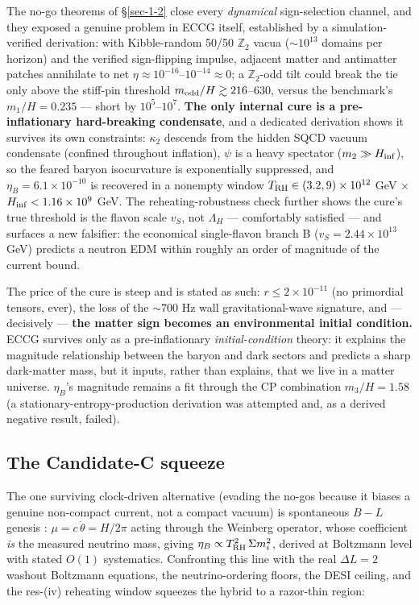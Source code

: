 \documentclass[submission, Phys]{SciPost}
\begin{document}
The no-go theorems of §\ref{sec-1-2} close every \emph{dynamical}
sign-selection channel, and they exposed a genuine problem in ECCG
itself, established by a simulation-verified derivation: with
Kibble-random 50/50 \(\mathbb{Z}_2\) vacua (\(\sim 10^{13}\) domains per
horizon) and the verified sign-flipping impulse, adjacent matter and
antimatter patches annihilate to net
\(\eta \approx 10^{-16}\)--\(10^{-14} \approx 0\); a
\(\mathbb{Z}_2\)-odd tilt could break the tie only above the stiff-pin
threshold \(m_{\rm odd}/H \gtrsim 216\)--\(630\), versus the benchmark's
\(m_1/H = 0.235\) --- short by \(10^5\)--\(10^7\). \textbf{The only
internal cure is a pre-inflationary hard-breaking condensate}, and a
dedicated derivation shows it survives its own constraints: \(\kappa_2\)
descends from the hidden SQCD vacuum condensate (confined throughout
inflation), \(\psi\) is a heavy spectator (\(m_2 \gg H_{\rm inf}\)), so
the feared baryon isocurvature is exponentially suppressed, and
\(\eta_B = 6.1\times 10^{-10}\) is recovered in a nonempty window
\(T_{\rm RH}\in(3.2, 9)\times 10^{12}\) GeV \(\times\)
\(H_{\rm inf} < 1.16\times 10^{9}\) GeV. The reheating-robustness check
further shows the cure's true threshold is the flavon scale \(v_S\), not
\(\Lambda_H\) --- comfortably satisfied --- and surfaces a new
falsifier: the economical single-flavon branch B
(\(v_S = 2.44\times 10^{13}\) GeV) predicts a neutron EDM within roughly
an order of magnitude of the current bound.

The price of the cure is steep and is stated as such:
\(r \le 2\times 10^{-11}\) (no primordial tensors, ever), the loss of
the \(\sim 700\) Hz wall gravitational-wave signature, and ---
decisively --- \textbf{the matter sign becomes an environmental initial
condition.} ECCG survives only as a pre-inflationary
\emph{initial-condition} theory: it explains the magnitude relationship
between the baryon and dark sectors and predicts a sharp dark-matter
mass, but it inputs, rather than explains, that we live in a matter
universe. \(\eta_B\)'s magnitude remains a fit through the CP
combination \(m_3/H = 1.58\) (a stationary-entropy-production derivation
was attempted and, as a derived negative result, failed).

\subsection{The Candidate-C squeeze}\label{sec-3-2}

The one surviving clock-driven alternative (evading the no-gos because
it biases a genuine non-compact current, not a compact vacuum) is
spontaneous \(B-L\) genesis \cite{Cohen:1987vi}:
\(\mu = c\,\dot\theta = H/2\pi\) acting through the Weinberg operator,
whose coefficient \emph{is} the measured neutrino mass, giving
\(\eta_B \propto T_{\rm RH}^2\,\Sigma m_i^2\), derived at Boltzmann
level with stated \(O(1)\) systematics. Confronting this line with the
real \(\Delta L = 2\) washout Boltzmann equations, the neutrino-ordering
floors, the DESI ceiling, and the res-(iv) reheating window squeezes the
hybrid to a razor-thin region:
\end{document}
